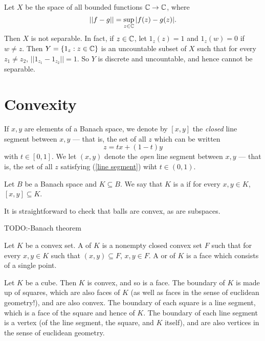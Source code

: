 \begin{example}\label{nonseparable space}
Let $X$ be the space of all bounded functions $\mathbb{C} \to \mathbb{C}$, where
\[||f - g|| = \sup_{z \in \mathbb{C}}|f(z) - g(z)|.\]
Then $X$ is not separable. In fact, if $z \in \mathbb{C}$, let $1_z(z) = 1$ and $1_z(w) = 0$ if $w \neq z$.
Then $Y=\{1_z: z \in \mathbb{C}\}$ is an uncountable subset of $X$ such that for every $z_1 \neq z_2$, $||1_{z_1} - 1_{z_2}|| =1$.
So $Y$ is discrete and uncountable, and hence cannot be separable.
\end{example}

\section{Convexity}
\begin{subsec}
If $x, y$ are elements of a Banach space, we denote by $[x, y]$ the \emph{closed} line segment between $x, y$ --- that is, the set of all $z$ which can be written
\begin{equation}\label{line segment}
z = tx + (1 - t)y
\end{equation}
with $t \in [0, 1]$.
We let $(x, y)$ denote the \emph{open} line segment between $x, y$ --- that is, the set of all $z$ satisfying (\ref{line segment}) wiht $t \in (0, 1)$.
\end{subsec}

\begin{definition}
Let $B$ be a Banach space and $K \subseteq B$. We say that $K$ is a  if for every $x, y \in K$, $[x, y] \subseteq K$.
\end{definition}

\begin{subsec}
It is straightforward to check that balls are convex, as are subspaces.
\end{subsec}

TODO:\@Hanh-Banach theorem

\begin{definition}
Let $K$ be a convex set. A  of $K$ is a nonempty closed convex set $F$ such that for every $x,y \in K$ such that $(x, y) \subseteq F$, $x, y \in F$.
A  or  of $K$ is a face which consists of a single point.
\end{definition}

\begin{example}\label{cube is convex}
Let $K$ be a cube. Then $K$ is convex, and so is a face. The boundary of $K$ is made up of squares, which are also faces of $K$ (as well as faces in the sense of euclidean geometry!), and are also convex. The boundary of each square is a line segment, which is a face of the square and hence of $K$. The boundary of each line segment is a vertex (of the line segment, the square, and $K$ itself), and are also vertices in the sense of euclidean geometry.
\end{example}

